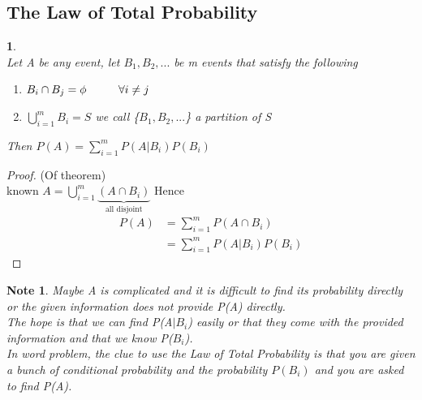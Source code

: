\documentclass[11pt]{article}
\newtheorem{theorem}{\framebox{Thm}}[section]
\newtheorem*{note}{Note}
\newcommand\tab[1][1cm]{\hspace*{#1}}
\begin{document}
            \subsection{The Law of Total Probability}
                \begin{theorem}\tab \\
                    Let A be any event, let $B_1, B_2, ...$ be m events that satisfy the following 
                    \begin{enumerate}
                        \item $B_i \cap B_j = \phi \tab \forall i \neq j$ 
                        \item $\bigcup\limits_{i=1}^m B_i = S$ we call \{$B_1,B_2,...$\} a partition of S
                    \end{enumerate}
                    Then $P(A) = \sum\limits_{i=1}^m P(A |B_i) P(B_i)$ 
                \end{theorem}
                \begin{proof}
                    (Of theorem)
                    \\known $A = \bigcup\limits_{i=1}^m \underbrace{(A\cap B_i)}_{\text{all disjoint}}$
                    Hence 
                    \begin{align*}
                        P(A)    &= \sum_{i=1}^m P(A \cap B_i) \tag{Ax 3} \\
                                &= \sum_{i=1}^m P(A | B_i) P(B_i)
                    \end{align*}
                \end{proof}
                \begin{note}
                    Maybe A is complicated and it is difficult to find its probability directly 
                    or the given information does not provide P(A) directly. \\
                    The hope is that we can find P(A$| B_i$) easily or that they come with the provided information 
                    and that we know P($B_i$).\\
                    In word problem, the clue to use the Law of Total Probability is that you are given a bunch of conditional probability and the probability $P(B_i)$ and you are asked to find P(A).
                \end{note}
        
\end{document}

